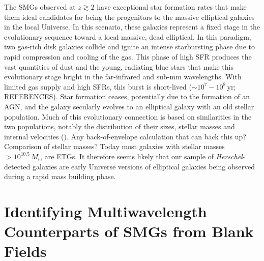 The SMGs observed at $z\gtrsim2$ have exceptional star formation rates that make them ideal candidates for being the progenitors to the massive elliptical galaxies in the local Universe. In this scenario, these galaxies represent a fixed stage in the evolutionary sequence toward a local massive, dead elliptical. In this paradigm, two gas-rich disk galaxies collide and ignite an intense starbursting phase due to rapid compression and cooling of the gas. This phase of high SFR produces the vast quantities of dust and the young, radiating blue stars that make this evolutionary stage bright in the far-infrared and sub-mm wavelengths. With limited gas supply and high SFRs, this burst is short-lived ($\sim 10^7 - 10^8\,$yr; {\color{red}REFERENCES}). Star formation ceases, potentially due to the formation of an AGN, and the galaxy secularly evolves to an elliptical galaxy with an old stellar population. Much of this evolutionary connection is based on similarities in the two populations, notably the distribution of their sizes, stellar masses and internal velocities (\citealt{Toft_2014}). {\color{red}Any back-of-envelope calculation that can back this up? Comparison of stellar masses? Today most galaxies with stellar masses $>10^{10.5}\,M_\odot$ are ETGs.} It therefore seems likely that our sample of \textit{Herschel}-detected galaxies are early Universe versions of elliptical galaxies being observed during a rapid mass building phase.

\section{Identifying Multiwavelength Counterparts of SMGs from Blank Fields}

